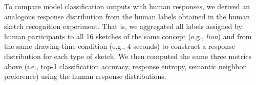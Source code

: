 \documentclass{article}
\begin{document}
To compare model classification outputs with human responses, we derived an analogous response distribution from the human labels obtained in the human sketch recognition experiment. 
That is, we aggregated all labels assigned by human participants to all 16 sketches of the same concept (e.g., \textit{lion}) and from the same drawing-time condition (e.g., 4 seconds) to construct a response distribution for each type of sketch. 
We then computed the same three metrics above (i.e., top-1 classification accuracy, response entropy, semantic neighbor preference) using the human response distributions. 

\end{document}
